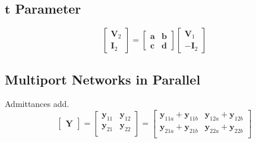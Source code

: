 	\subsection*{$\mathbf{t}$ Parameter} \label{subsec:t Parameter}
		\begin{equation*} \label{eq:t Parameter}
			\begin{bmatrix}
				\mathbf{V}_{2} \\
				\mathbf{I}_{2} 
			\end{bmatrix}
			=\begin{bmatrix}
				\mathbf{a} & \mathbf{b} \\
				\mathbf{c} & \mathbf{d}
			\end{bmatrix}
			\begin{bmatrix}
				\mathbf{V}_{1} \\
				\mathbf{-I}_{2} 
			\end{bmatrix}
		\end{equation*}
	
	\subsection*{Multiport Networks in Parallel} \label{subsec:Parallel Multiport Networks}
	Admittances add.
		\begin{equation*} \label{eq:Parallel Multiport Networks}
			\begin{bmatrix}
				\mathbf{Y}
			\end{bmatrix}
			= \begin{bmatrix}
				\mathbf{y}_{11} & \mathbf{y}_{12} \\
				\mathbf{y}_{21} & \mathbf{y}_{22} \\
			\end{bmatrix}
			= \begin{bmatrix}
				\mathbf{y}_{11a}+\mathbf{y}_{11b} & \mathbf{y}_{12a}+\mathbf{y}_{12b} \\
				\mathbf{y}_{21a}+\mathbf{y}_{21b} & \mathbf{y}_{22a}+\mathbf{y}_{22b} \\
			\end{bmatrix}
		\end{equation*}
		
